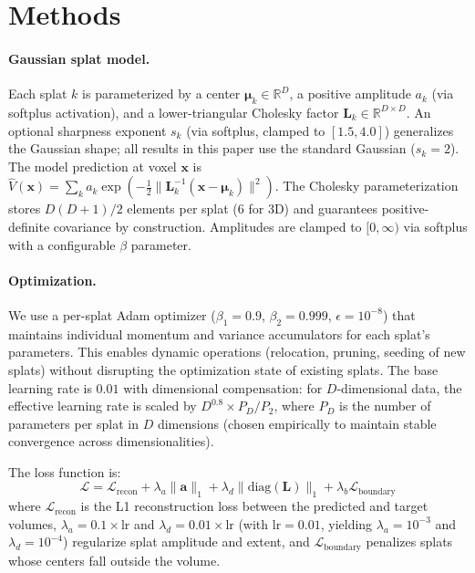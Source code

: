 \section*{Methods}

\paragraph{Gaussian splat model.}
Each splat $k$ is parameterized by a center $\boldsymbol{\mu}_k \in \mathbb{R}^D$, a positive amplitude $a_k$ (via softplus activation), and a lower-triangular Cholesky factor $\mathbf{L}_k \in \mathbb{R}^{D \times D}$.
An optional sharpness exponent $s_k$ (via softplus, clamped to $[1.5, 4.0]$) generalizes the Gaussian shape; all results in this paper use the standard Gaussian ($s_k = 2$).
The model prediction at voxel $\mathbf{x}$ is
$\hat{V}(\mathbf{x}) = \sum_{k} a_k \exp\!\left(-\frac{1}{2}\|\mathbf{L}_k^{-1}(\mathbf{x} - \boldsymbol{\mu}_k)\|^{2}\right)$.
The Cholesky parameterization stores $D(D{+}1)/2$ elements per splat (6 for 3D) and guarantees positive-definite covariance by construction.
Amplitudes are clamped to $[0, \infty)$ via softplus with a configurable $\beta$ parameter.

\paragraph{Optimization.}
We use a per-splat Adam optimizer\cite{kingma2015adam} ($\beta_1{=}0.9$, $\beta_2{=}0.999$, $\epsilon{=}10^{-8}$) that maintains individual momentum and variance accumulators for each splat's parameters.
This enables dynamic operations (relocation, pruning, seeding of new splats) without disrupting the optimization state of existing splats.
The base learning rate is $0.01$ with dimensional compensation: for $D$-dimensional data, the effective learning rate is scaled by $D^{0.8} \times P_D / P_2$, where $P_D$ is the number of parameters per splat in $D$ dimensions (chosen empirically to maintain stable convergence across dimensionalities).

The loss function is:
\begin{equation}
\mathcal{L} = \mathcal{L}_\text{recon} + \lambda_a \|\mathbf{a}\|_1 + \lambda_d \|\text{diag}(\mathbf{L})\|_1 + \lambda_b \mathcal{L}_\text{boundary}
\end{equation}
where $\mathcal{L}_\text{recon}$ is the L1 reconstruction loss between the predicted and target volumes, $\lambda_a = 0.1 \times \text{lr}$ and $\lambda_d = 0.01 \times \text{lr}$ (with $\text{lr} = 0.01$, yielding $\lambda_a = 10^{-3}$ and $\lambda_d = 10^{-4}$) regularize splat amplitude and extent, and $\mathcal{L}_\text{boundary}$ penalizes splats whose centers fall outside the volume.

